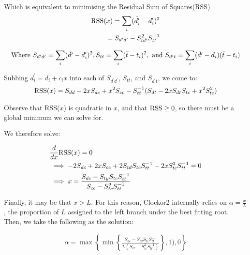 \documentclass{article}
\begin{document}
Which is equivalent to minimising the Residual Sum of Squares(RSS)
\begin{equation}
\begin{aligned}
    \textnormal{RSS}(x) = \sum_{i}(\hat{d^{\prime}_i} - d^{\prime}_i)^2 \\
    = S_{d^{\prime}d^{\prime}} - S_{td^{\prime}}^2S_{tt}^{-1}
\end{aligned}
\end{equation}

\begin{equation}
\begin{aligned}
        \textnormal{Where } S_{d^{\prime}d^{\prime}} = \sum_{i}(\bar{d^{\prime}} - d^{\prime}_i)^2,
        S_{tt}= \sum_{i}(\bar{t} - t_i)^2, \textnormal{ and } 
        S_{d^{\prime}t} = \sum_{i}(\bar{d^{\prime}}-d_i)(\bar{t}-t_i)
\end{aligned}
\end{equation}

Subbing $d^{\prime}_i = d_{i} + c_{i}x$ into each of $S_{d^{\prime}d^{\prime}}$, $S_{tt}$, and $S_{d^{\prime}t}$, we come to:
\begin{equation}
\begin{aligned}
    \textnormal{RSS}(x) = S_{dd} - 2xS_{dc} + x^{2}S_{cc} - S_{tt}^{-1}(S_{dt} - 2xS_{dt}S_{tc} + x^{2}S_{tc}^{2})
\end{aligned}
\end{equation}


Observe that RSS($x$) is quadratic in $x$, and that $ \textnormal{RSS} \ge 0$, so there must be a global minimum we can solve for.

We therefore solve:

\begin{equation}
\begin{aligned}
    &\frac{d}{dx}\textnormal{RSS}(x) = 0 \\
    &\implies  -2S_{dc} + 2xS_{cc} + 2S_{td}S_{tc}S_{tt}^{-1} - 2xS_{tc}^{2}S_{tt}^{-1} = 0 \\
    &\implies x = \frac{S_{dc}-S_{ty}S_{tc}S_{tt}^{-1}}{S_{cc}-S_{tc}^2S_{tt}^{-1}}
\end{aligned}
\end{equation}

Finally, it may be that $x > L$. For this reason, Clockor2 internally relies on $\alpha = \frac{x}{L}$, the proportion of $L$ assigned to the left branch under the best fitting root. Then, we take the following as the solution:

\begin{equation}
\begin{aligned}
    \alpha = \max \left \{ \min \left \{ \frac{S_{dc}-S_{td}S_{tc}S_{tt}^{-1}}{L(S_{cc}-S_{tc}^2S_{tt}^{-1})} \right \}, 1), 0  \right \} 
\end{aligned}
\end{equation}

\newpage

\end{document}
